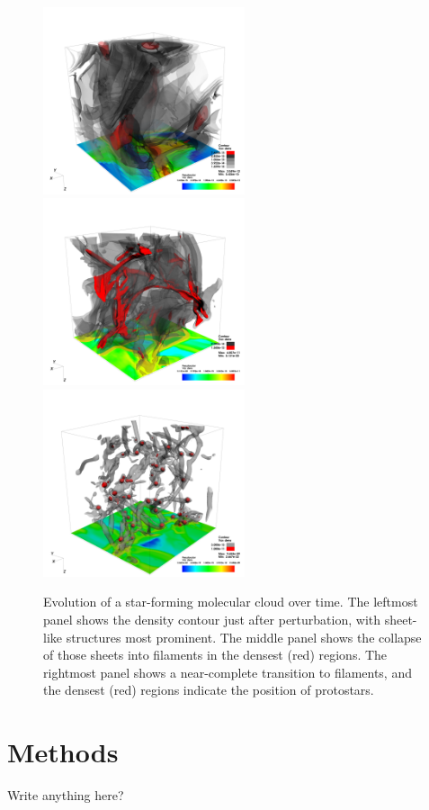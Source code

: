 \documentclass[iop]{emulateapj}
\begin{document}
\begin{figure}[ht]
\begin{center}
\includegraphics[height=5.5cm,clip=true]{Graphics/bbb_0375_dens_contour_00500000.png}%
\includegraphics[height=5.5cm,clip=true]{Graphics/bbb_0375_dens_contour_0200_0002.png}%
\includegraphics[height=5.5cm,clip=true]{Graphics/bbb_0375_dens_contour0000.png}
\end{center}
\caption{Evolution of a star-forming molecular cloud over time. The leftmost panel shows the density contour just after perturbation, with sheet-like structures most prominent. The middle panel shows the collapse of those sheets into filaments in the densest (red) regions. The rightmost panel shows a near-complete transition to filaments, and the densest (red) regions indicate the position of protostars.}
\label{f:cloudevolution}
\end{figure}

\section{Methods}\label{Methods}
{\Large Write anything here?}
\end{document}
